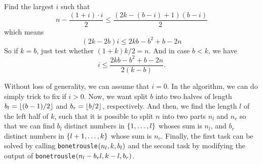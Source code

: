 \documentclass{article}
\DeclarePairedDelimiter\floor{\lfloor}{\rfloor}
\DeclarePairedDelimiter\set{\{}{\}}
\DeclarePairedDelimiter\paren{(}{)}
\begin{document}
Find the largest $i$ such that
\[
	n - \frac{(1 + i) \cdot i}{2} \leq \frac{(2k - (b - i) + 1)(b - i)}{2}
\]
which means
\[
	(2k - 2b)i \leq 2kb - b^2 + b - 2n
\]
So if $k = b$, just test whether $(1 + k)k / 2 = n$.
And in case $b < k$, we have
\[
	i \leq \frac{2kb - b^2 + b - 2n}{2(k - b)}.
\]

Without loss of generality, we can assume that $i = 0$. 
In the algorithm, we can do simply trick to fix if $i > 0$.
Now, we want split $b$ into two halves of length $b_l = \floor{(b - 1) / 2}$ and $b_r = \floor{b / 2}$, respectively. 
And then, we find the length $l$ of the left half of $k$, such that it is possible to split $n$ into 
two parts $n_l$ and $n_r$ so that we can find $b_l$ distinct numbers in $\set{1, \dots, l}$ whoses sum is $n_l$, 
and $b_r$ distinct numbers in $\set{l + 1, \dots, k}$ whose sum is $n_r$.
Finally, the first task can be solved by calling \texttt{bonetrousle}$\paren{n_l, k, b_l}$ 
and the second task by modifying the output of \texttt{bonetrousle}$\paren{n_l - b_rl, k - l, b_r}$.
\end{document}
